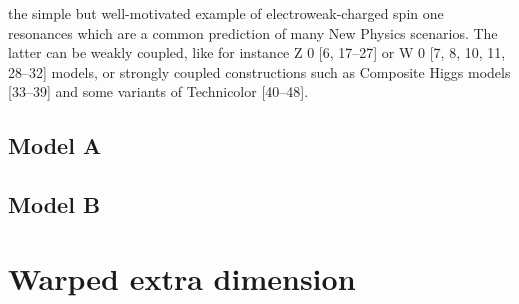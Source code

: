 {\color{red}
the simple but well-motivated example of electroweak-charged spin one resonances which are a
common prediction of many New Physics scenarios. The latter can be weakly coupled, like for
instance Z 0 [6, 17–27] or W 0 [7, 8, 10, 11, 28–32] models, or strongly coupled constructions such
as Composite Higgs models [33–39] and some variants of Technicolor [40–48].}



\subsection{Model A}
\label{sec:theory_HVT_A}

\subsection{Model B}
\label{sec:theory_HVT_B}

\section{Warped extra dimension}
\label{sec:theory_WED}


\clearpage


